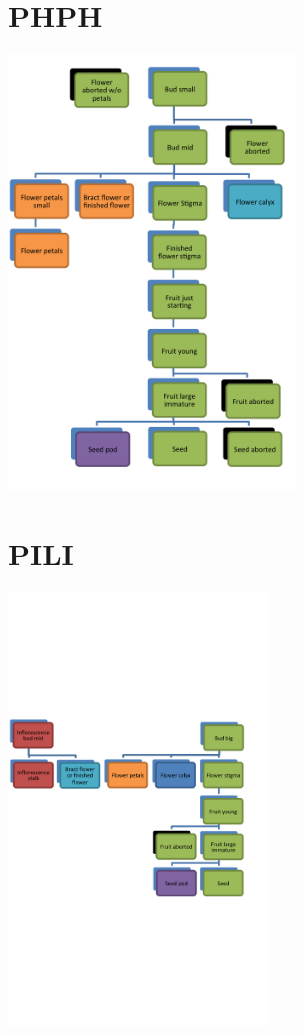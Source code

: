 \documentclass[10pt]{book} %
\begin{document}
\clearpage
\newpage
\section{PHPH}
\begin{multicols}{2}
\includegraphics[width=3in]{images/PHPH.png}
\vfill
\columnbreak

\end{multicols}



\clearpage
\newpage
\section{PILI}
\begin{multicols}{2}
\includegraphics[width=2.7in]{images/PILI.png}
\vfill
\columnbreak

\end{multicols}
\end{document}
